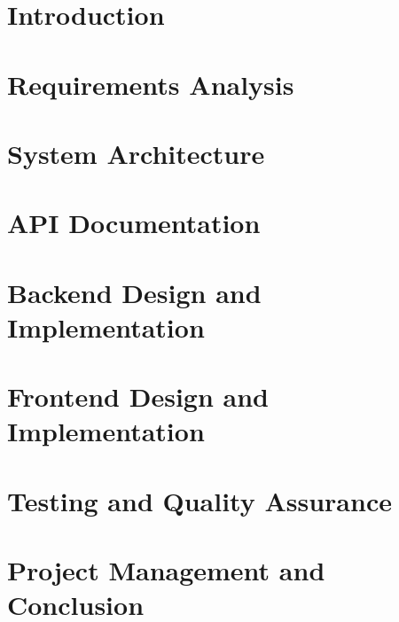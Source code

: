 \documentclass[12pt,a4paper,twoside]{report}
\begin{document}
\tableofcontents
\listoffigures
\newpage

\chapter{Introduction}


\chapter{Requirements Analysis}


\chapter{System Architecture}


\chapter{API Documentation}


\chapter{Backend Design and Implementation}


\chapter{Frontend Design and Implementation}


\chapter{Testing and Quality Assurance}


\chapter{Project Management and Conclusion}

\end{document}
